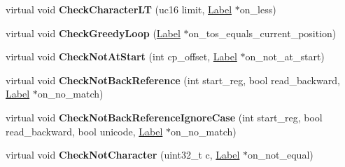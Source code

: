 \begin{DoxyCompactItemize}
\item 
virtual void {\bfseries Check\+Character\+LT} (uc16 limit, \hyperlink{classv8_1_1internal_1_1_label}{Label} $\ast$on\+\_\+less)\hypertarget{classv8_1_1internal_1_1_reg_exp_macro_assembler_m_i_p_s_aeb4a8f3d2314494596589c9b1543faef}{}\label{classv8_1_1internal_1_1_reg_exp_macro_assembler_m_i_p_s_aeb4a8f3d2314494596589c9b1543faef}

\item 
virtual void {\bfseries Check\+Greedy\+Loop} (\hyperlink{classv8_1_1internal_1_1_label}{Label} $\ast$on\+\_\+tos\+\_\+equals\+\_\+current\+\_\+position)\hypertarget{classv8_1_1internal_1_1_reg_exp_macro_assembler_m_i_p_s_ae3b5ebd2bfaefa19786e18e5103b2881}{}\label{classv8_1_1internal_1_1_reg_exp_macro_assembler_m_i_p_s_ae3b5ebd2bfaefa19786e18e5103b2881}

\item 
virtual void {\bfseries Check\+Not\+At\+Start} (int cp\+\_\+offset, \hyperlink{classv8_1_1internal_1_1_label}{Label} $\ast$on\+\_\+not\+\_\+at\+\_\+start)\hypertarget{classv8_1_1internal_1_1_reg_exp_macro_assembler_m_i_p_s_aca545a4b5e0b1b8cf0cc2fd6778eb8f1}{}\label{classv8_1_1internal_1_1_reg_exp_macro_assembler_m_i_p_s_aca545a4b5e0b1b8cf0cc2fd6778eb8f1}

\item 
virtual void {\bfseries Check\+Not\+Back\+Reference} (int start\+\_\+reg, bool read\+\_\+backward, \hyperlink{classv8_1_1internal_1_1_label}{Label} $\ast$on\+\_\+no\+\_\+match)\hypertarget{classv8_1_1internal_1_1_reg_exp_macro_assembler_m_i_p_s_af33344a5d113a2f1318f2549554fdaca}{}\label{classv8_1_1internal_1_1_reg_exp_macro_assembler_m_i_p_s_af33344a5d113a2f1318f2549554fdaca}

\item 
virtual void {\bfseries Check\+Not\+Back\+Reference\+Ignore\+Case} (int start\+\_\+reg, bool read\+\_\+backward, bool unicode, \hyperlink{classv8_1_1internal_1_1_label}{Label} $\ast$on\+\_\+no\+\_\+match)\hypertarget{classv8_1_1internal_1_1_reg_exp_macro_assembler_m_i_p_s_a797e74e54cda0b9368dbe36c8f9bb704}{}\label{classv8_1_1internal_1_1_reg_exp_macro_assembler_m_i_p_s_a797e74e54cda0b9368dbe36c8f9bb704}

\item 
virtual void {\bfseries Check\+Not\+Character} (uint32\+\_\+t c, \hyperlink{classv8_1_1internal_1_1_label}{Label} $\ast$on\+\_\+not\+\_\+equal)\hypertarget{classv8_1_1internal_1_1_reg_exp_macro_assembler_m_i_p_s_af2c6643d958982b07b49338a10e0f07c}{}\label{classv8_1_1internal_1_1_reg_exp_macro_assembler_m_i_p_s_af2c6643d958982b07b49338a10e0f07c}


\end{DoxyCompactItemize}
